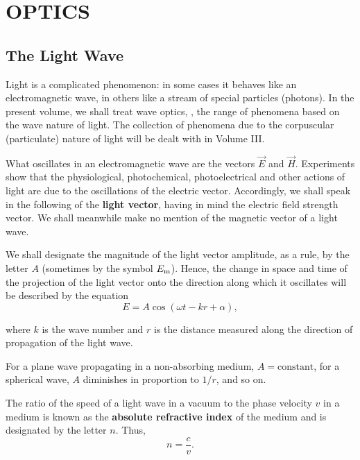 

\chapter[OPTICS]{OPTICS}\label{chap:16}

\section{The Light Wave}\label{sec:16_1}

Light is a complicated phenomenon: in some cases it behaves like an electromagnetic wave, in others like a stream of special particles (photons).
In the present volume, we shall treat wave optics, \ie, the range of phenomena based on the wave nature of light.
The collection of phenomena due to the corpuscular (particulate) nature of light will be dealt with in Volume III.

What oscillates in an electromagnetic wave are the vectors $\vec{E}$ and $\vec{H}$.
Experiments show that the physiological, photochemical, photoelectrical and other actions of light are due to the oscillations of the electric vector.
Accordingly, we shall speak in the following of the \textbf{light vector}, having in mind the electric field strength vector.
We shall meanwhile make no mention of the magnetic vector of a light wave.

We shall designate the magnitude of the light vector amplitude, as a rule, by the letter $A$ (sometimes by the symbol $E_{\text{m}}$).
Hence, the change in space and time of the projection of the light vector onto the direction along which it oscillates will be described by the equation
\begin{equation}\label{eq:16_1}
    E = A \cos(\omega t - kr + \alpha),
\end{equation}

\noindent
where $k$ is the wave number and $r$ is the distance measured along the direction of propagation of the light wave.

For a plane wave propagating in a non-absorbing medium, $A = \text{constant}$, for a spherical wave, $A$ diminishes in proportion to $1/r$, and so on.

The ratio of the speed of a light wave in a vacuum to the phase velocity $v$ in a medium is known as the \textbf{absolute refractive index} of the medium and is designated by the letter $n$.
Thus,
\begin{equation}\label{eq:16_2}
    n = \frac{c}{v}.
\end{equation}

